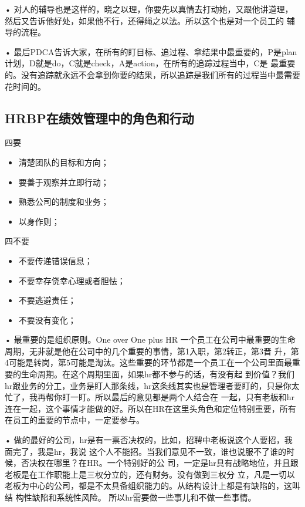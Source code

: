 \documentclass[12pt]{article}
\begin{document}
• 对人的辅导也是这样的，晓之以理，你要先以真情去打动她，又跟他讲道理，然后又告诉他好处，如果他不行，还得绳之以法。所以这个也是对一个员工的 辅导的流程。

• 最后PDCA告诉大家，在所有的盯目标、追过程、拿结果中最重要的，P是plan计划，D就是do，C就是check，A是action，在所有的追踪过程当中，C是 最重要的。没有追踪就永远不会拿到你要的结果，所以追踪是我们所有的过程当中最需要花时间的。

\subsection{HRBP在绩效管理中的角色和行动}
四要
\begin{itemize}
\setlength{\itemsep}{0pt}
\setlength{\parsep}{0pt}
\setlength{\parskip}{0pt}
    \item 清楚团队的目标和方向；
    \item 要善于观察并立即行动；
    \item 熟悉公司的制度和业务；
    \item 以身作则；
\end{itemize}

四不要
\begin{itemize}
\setlength{\itemsep}{0pt}
\setlength{\parsep}{0pt}
\setlength{\parskip}{0pt}
    \item 不要传递错误信息；
    \item 不要幸存侥幸心理或者胆怯；
    \item 不要逃避责任；
    \item 不要没有变化；
\end{itemize}

• 最重要的是组织原则。One over One plus HR 一个员工在公司中最重要的生命周期，无非就是他在公司中的几个重要的事情，第1入职，第2转正，第3晋 升，第4可能是转岗，第5可能是淘汰。这些重要的环节都是一个员工在一个公司里面最重要的生命周期。在这个周期里面，如果hr都不参与的话，有没有起 到价值？我们hr跟业务的分工，业务是盯人那条线，hr这条线其实也是管理者要盯的，只是你太忙了，我再帮你盯一盯。所以最后的意见都是两个人结合在 一起，只有老板和hr连在一起，这个事情才能做的好。所以在HR在这里头角色和定位特别重要，所有在员工的重要的节点中，一定要参与。

• 做的最好的公司，hr是有一票否决权的，比如，招聘中老板说这个人要招，我面完了，我是hr，我说 这个人不能招。当我们意见不一致，谁也说服不了谁的时候，否决权在哪里？在HR。一个特别好的公 司，一定是hr具有战略地位，并且跟老板是在工作职能上是三权分立的，还有财务。没有做到三权分 立，凡是一切以老板为中心的公司，都是不太具备组织能力的。从结构设计上都是有缺陷的，这叫结 构性缺陷和系统性风险。 所以hr需要做一些事儿和不做一些事情。
\end{document}
